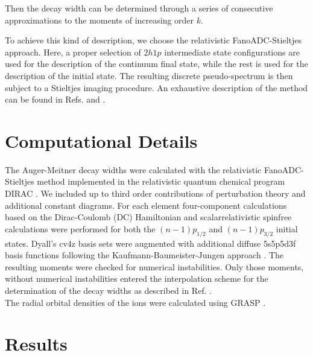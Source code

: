\documentclass[aps,amssymb,preprint,a4paper,longbibliography]{revtex4}
\begin{document}
Then the decay width can be determined through a series of
consecutive approximations to the moments of increasing order $k$.

To achieve this kind of description, we choose the relativistic
FanoADC-Stieltjes approach.
Here, a proper selection of $2h1p$ intermediate state configurations are used
for the description of the continuum final state,
while the rest is used for the description
of the initial state.
The resulting discrete pseudo-spectrum
is then subject to a Stieltjes imaging procedure.
An exhaustive description of the method can be found in Refs. \cite{Fasshauer15_1}
and \cite{Fasshauer_thesis}.

%
\section{Computational Details}
\label{section:computational}
The Auger-Meitner
decay widths were calculated with the relativistic FanoADC-Stieltjes
method
implemented in the relativistic quantum chemical program DIRAC \cite{DIRAC17}.
We included up to third order contributions of perturbation theory and additional
constant diagrams.
For each element four-component calculations based on the
Dirac-Coulomb (DC) Hamiltonian
and scalarrelativistic spinfree calculations were
performed for both the $(n-1)p_{1/2}$ and $(n-1)p_{3/2}$ initial states.
Dyall's cv4z basis sets \cite{Dyall4s-7s09} were augmented with additional diffuse
5s5p5d3f
basis functions following the Kaufmann-Baumeister-Jungen approach
\cite{Kaufmann89}.
The resulting moments were checked for numerical instabilities.
Only those moments, without numerical instabilities entered the interpolation
scheme for the determination of the decay widths
{as described in Ref. \cite{Fasshauer15_1}}.\\
The radial orbital densities of the ions were calculated using GRASP
\cite{Dyall89,Parpia96}.

%
\section{Results}
\label{section:results}
\end{document}
